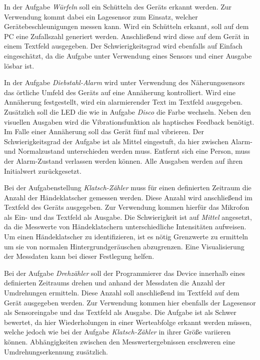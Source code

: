 \documentclass[11pt,a4paper]{report}
\begin{document}
In der Aufgabe \textit{Würfeln} soll ein Schütteln des Geräts erkannt werden.
Zur Verwendung kommt dabei ein Lagesensor zum Einsatz, welcher Gerätebeschleunigungen messen kann.
Wird ein Schütteln erkannt, soll auf dem PC eine Zufallszahl generiert werden.
Anschließend wird diese auf dem Gerät in einem Textfeld ausgegeben.
Der Schwierigkeitsgrad wird ebenfalls auf Einfach eingeschätzt, da die Aufgabe unter Verwendung eines Sensors und einer Ausgabe lösbar ist.

In der Aufgabe \textit{Diebstahl-Alarm} wird unter Verwendung des Näherungssensors das örtliche Umfeld des Geräts auf eine Annäherung kontrolliert.
Wird eine Annäherung festgestellt, wird ein alarmierender Text im Textfeld ausgegeben.
Zusätzlich soll die LED die wie in Aufgabe \textit{Disco} die Farbe wechseln.
Neben den visuellen Ausgaben wird die Vibrationsfunktion als haptisches Feedback benötigt.
Im Falle einer Annäherung soll das Gerät fünf mal vibrieren.
Der Schwierigkeitsgrad der Aufgabe ist als Mittel eingestuft, da hier zwischen Alarm- und Normalzustand unterschieden werden muss.
Entfernt sich eine Person, muss der Alarm-Zustand verlassen werden können.
Alle Ausgaben werden auf ihren Initialwert zurückgesetzt.

Bei der Aufgabenstellung \textit{Klatsch-Zähler} muss für einen definierten Zeitraum die Anzahl der Händeklatscher gemessen werden.
Diese Anzahl wird anschließend im Textfeld des Geräts ausgegeben.
Zur Verwendung kommen hierfür das Mikrofon als Ein- und das Textfeld als Ausgabe.
Die Schwierigkeit ist auf \textit{Mittel} angesetzt, da die Messwerte von Händeklatschern unterschiedliche Intensitäten aufweisen.
Um einen Händeklatscher zu identifizieren, ist es nötig Grenzwerte zu ermitteln um sie von normalen Hintergrundgeräuschen abzugrenzen.
Eine Visualisierung der Messdaten kann bei dieser Festlegung helfen.

Bei der Aufgabe \textit{Drehzähler} soll der Programmierer das Device innerhalb eines definierten Zeitraums drehen und anhand der Messdaten die Anzahl der Umdrehungen ermitteln.
Diese Anzahl soll anschließend im Textfeld auf dem Gerät ausgegeben werden.
Zur Verwendung kommen hier ebenfalls der Lagesensor als Sensoreingabe und das Textfeld als Ausgabe.
Die Aufgabe ist als Schwer bewertet, da hier Wiederholungen in einer Werteabfolge erkannt werden müssen, welche jedoch wie bei der Aufgabe \textit{Klatsch-Zähler} in ihrer Größe variieren können.
Abhängigkeiten zwischen den Messwertergebnissen erschweren eine Umdrehungserkennung zusätzlich.
\end{document}
